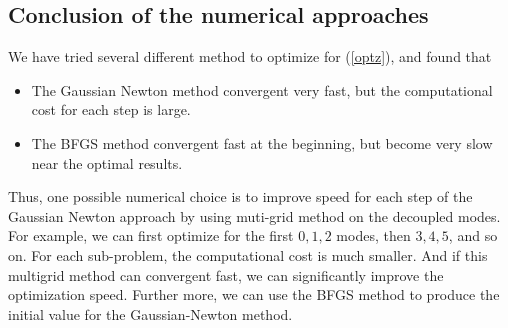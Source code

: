 \documentclass[9pt,twocolumn]{extarticle}
\begin{document}

\subsection{Conclusion of the numerical approaches}
We have tried several different method to optimize for (\ref{optz}), and found
that 
\begin{itemize}
\item The Gaussian Newton method convergent very fast, but the computational
  cost for each step is large.
\item The BFGS method convergent fast at the beginning, but become very slow
  near the optimal results.
\end{itemize}
Thus, one possible numerical choice is to improve speed for each step of the
Gaussian Newton approach by using muti-grid method on the decoupled modes. For
example, we can first optimize for the first $0,1,2$ modes, then $3,4,5$, and so
on. For each sub-problem, the computational cost is much smaller. And if this
multigrid method can convergent fast, we can significantly improve the
optimization speed. Further more, we can use the BFGS method to produce the
initial value for the Gaussian-Newton method.
\end{document}
